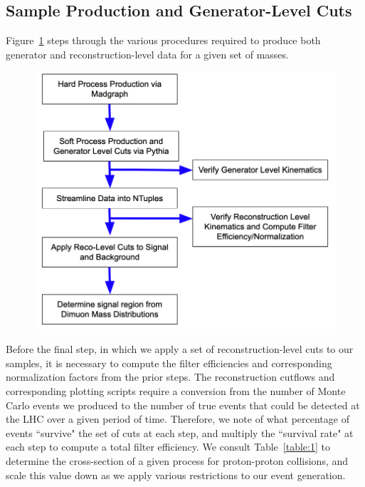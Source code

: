\documentclass{article}
\begin{document}
\subsection{Sample Production and Generator-Level Cuts}
Figure~\ref{fig:5} steps through the various procedures required to produce both generator and reconstruction-level data for a given set of masses. 
\begin{figure}[H]
    \centering
    \caption{} 
    \includegraphics[width=12cm]{Workflow.png}
    \label{fig:5}
\end{figure}
\par
Before the final step, in which we apply a set of reconstruction-level cuts to our samples, it is necessary to compute the filter efficiencies and corresponding normalization factors from the prior steps. The reconstruction cutflows and corresponding plotting scripts require a conversion from the number of Monte Carlo events we produced to the number of true events that could be detected at the LHC over a given period of time. Therefore, we note of what percentage of events ``survive" the set of cuts at each step, and multiply the ``survival rate" at each step to compute a total filter efficiency. We consult Table~\ref{table:1} to determine the cross-section of a given process for proton-proton collisions, and scale this value down as we apply various restrictions to our event generation.
\end{document}
